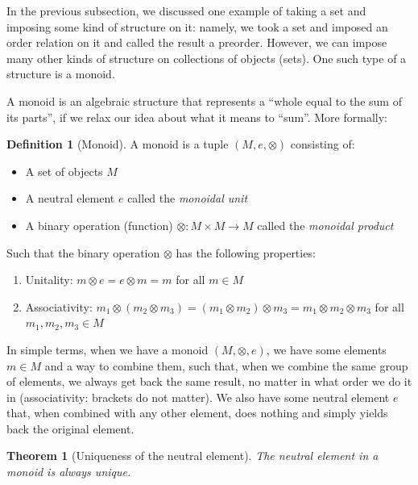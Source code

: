 \documentclass[
]{book}
\providecommand{\tightlist}{%
  \setlength{\itemsep}{0pt}\setlength{\parskip}{0pt}}
\newtheorem{theorem}{Theorem}[chapter]
\theoremstyle{definition}
\newtheorem{definition}{Definition}[chapter]
\theoremstyle{definition}
\theoremstyle{definition}
\theoremstyle{definition}
\theoremstyle{remark}
\begin{document}
In the previous subsection, we discussed one example of taking a set and imposing some kind of structure on it: namely, we took a set and imposed an order relation on it and called the result a preorder. However, we can impose many other kinds of structure on collections of objects (sets). One such type of a structure is a monoid.

A monoid is an algebraic structure that represents a ``whole equal to the sum of its parts'', if we relax our idea about what it means to ``sum''. More formally:

\begin{definition}[Monoid]

A monoid is a tuple \((M, e, \otimes)\) consisting of:

\begin{itemize}
\tightlist
\item
  A set of objects \(M\)
\item
  A neutral element \(e\) called the \emph{monoidal unit}
\item
  A binary operation (function) \(\otimes: M \times M \to M\) called the \emph{monoidal product}
\end{itemize}

Such that the binary operation \(\otimes\) has the following properties:

\begin{enumerate}
\def\labelenumi{\arabic{enumi}.}
\tightlist
\item
  Unitality: \(m \otimes e = e \otimes m = m\) for all \(m \in M\)
\item
  Associativity: \(m_1 \otimes (m_2 \otimes m_3) = (m_1 \otimes m_2) \otimes m_3 = m_1 \otimes m_2 \otimes m_3\) for all \(m_1, m_2, m_3 \in M\)
\end{enumerate}

\end{definition}

In simple terms, when we have a monoid \((M, \otimes, e)\), we have some elements \(m \in M\) and a way to combine them, such that, when we combine the same group of elements, we always get back the same result, no matter in what order we do it in (associativity: brackets do not matter). We also have some neutral element \(e\) that, when combined with any other element, does nothing and simply yields back the original element.

\begin{theorem}[Uniqueness of the neutral element]
The neutral element in a monoid is always unique.
\end{theorem}
\end{document}
